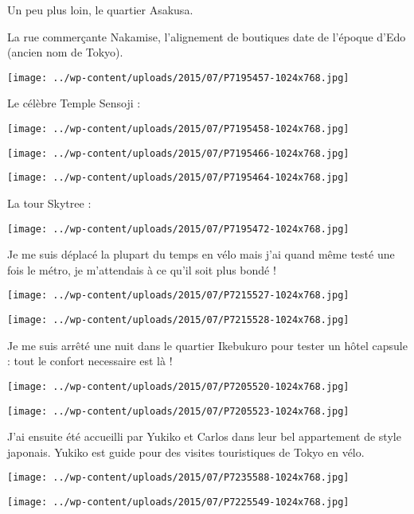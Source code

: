  Un peu plus loin, le quartier Asakusa.

 La rue commerçante Nakamise, l'alignement de boutiques date de l'époque d'Edo (ancien nom de Tokyo). 
\begin{center} \texttt{[image: ../wp-content/uploads/2015/07/P7195457-1024x768.jpg]} \end{center}

\pagebreak
 Le célèbre Temple Sensoji :
\begin{center} \texttt{[image: ../wp-content/uploads/2015/07/P7195458-1024x768.jpg]} \end{center}
\begin{center} \texttt{[image: ../wp-content/uploads/2015/07/P7195466-1024x768.jpg]} \end{center}
\begin{center} \texttt{[image: ../wp-content/uploads/2015/07/P7195464-1024x768.jpg]} \end{center}

 La tour Skytree :
\begin{center} \texttt{[image: ../wp-content/uploads/2015/07/P7195472-1024x768.jpg]} \end{center}

\pagebreak
 Je me suis déplacé la plupart du temps en vélo mais j'ai quand même testé une fois le métro, je m'attendais à ce qu'il soit plus bondé ! 
\begin{center} \texttt{[image: ../wp-content/uploads/2015/07/P7215527-1024x768.jpg]} \end{center}
\begin{center} \texttt{[image: ../wp-content/uploads/2015/07/P7215528-1024x768.jpg]} \end{center}

\pagebreak
 Je me suis arrêté une nuit dans le quartier Ikebukuro pour tester un hôtel capsule : tout le confort necessaire est là ! 
\begin{center} \texttt{[image: ../wp-content/uploads/2015/07/P7205520-1024x768.jpg]} \end{center}
\begin{center} \texttt{[image: ../wp-content/uploads/2015/07/P7205523-1024x768.jpg]} \end{center}

\pagebreak
 J'ai ensuite été accueilli par Yukiko et Carlos dans leur bel appartement de style japonais. Yukiko est guide pour des visites touristiques de Tokyo en vélo. 
\begin{center} \texttt{[image: ../wp-content/uploads/2015/07/P7235588-1024x768.jpg]} \end{center}
\begin{center} \texttt{[image: ../wp-content/uploads/2015/07/P7225549-1024x768.jpg]} \end{center}

